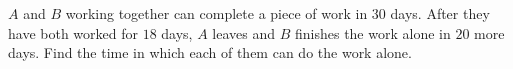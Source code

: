 $A$ and $B$ working together can complete a piece of work in $30$ days. After they have both worked for $18$ days, $A$ leaves and $B$ finishes the work alone in $20$ more days. Find the time in which each of them can do the work alone.
